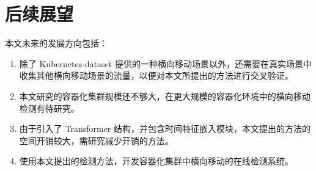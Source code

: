 {\section{后续展望}

本文未来的发展方向包括：

\begin{enumerate}
    \item 除了 Kubernetes-dataset 提供的一种横向移动场景以外，还需要在真实场景中收集其他横向移动场景的流量，以便对本文所提出的方法进行交叉验证。
    \item 本文研究的容器化集群规模还不够大，在更大规模的容器化环境中的横向移动检测有待研究。
    \item 由于引入了 Transformer 结构，并包含时间特征嵌入模块，本文提出的方法的空间开销较大，需研究减少开销的方法。
    \item 使用本文提出的检测方法，开发容器化集群中横向移动的在线检测系统。
\end{enumerate}
}